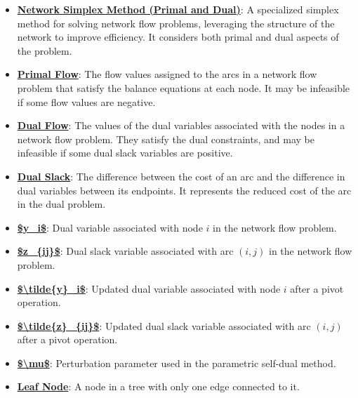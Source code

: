 \documentclass{article}%
\begin{document}
\begin{itemize}[leftmargin=*]%
\item \href{https://www.math.purdue.edu/~yipn/421//2024-11-07-NetSimplex.pdf#page=1}{\textbf{Network Simplex Method (Primal and Dual)}}: A specialized simplex method for solving network flow problems, leveraging the structure of the network to improve efficiency. It considers both primal and dual aspects of the problem.%
\item \href{https://www.math.purdue.edu/~yipn/421//2024-11-07-NetSimplex.pdf#page=2}{\textbf{Primal Flow}}: The flow values assigned to the arcs in a network flow problem that satisfy the balance equations at each node.  It may be infeasible if some flow values are negative.%
\item \href{https://www.math.purdue.edu/~yipn/421//2024-11-07-NetSimplex.pdf#page=3}{\textbf{Dual Flow}}: The values of the dual variables associated with the nodes in a network flow problem.  They satisfy the dual constraints, and may be infeasible if some dual slack variables are positive.%
\item \href{https://www.math.purdue.edu/~yipn/421//2024-11-07-NetSimplex.pdf#page=3}{\textbf{Dual Slack}}: The difference between the cost of an arc and the difference in dual variables between its endpoints.  It represents the reduced cost of the arc in the dual problem.%
\item \href{https://www.math.purdue.edu/~yipn/421//2024-11-07-NetSimplex.pdf#page=3}{\textbf{\$y\_i\$}}: Dual variable associated with node $i$ in the network flow problem.%
\item \href{https://www.math.purdue.edu/~yipn/421//2024-11-07-NetSimplex.pdf#page=3}{\textbf{\$z\_\{ij\}\$}}: Dual slack variable associated with arc $(i,j)$ in the network flow problem.%
\item \href{https://www.math.purdue.edu/~yipn/421//2024-11-07-NetSimplex.pdf#page=14}{\textbf{\$\textbackslash{}tilde\{y\}\_i\$}}: Updated dual variable associated with node $i$ after a pivot operation.%
\item \href{https://www.math.purdue.edu/~yipn/421//2024-11-07-NetSimplex.pdf#page=14}{\textbf{\$\textbackslash{}tilde\{z\}\_\{ij\}\$}}: Updated dual slack variable associated with arc $(i,j)$ after a pivot operation.%
\item \href{https://www.math.purdue.edu/~yipn/421//2024-11-07-NetSimplex.pdf#page=45}{\textbf{\$\textbackslash{}mu\$}}: Perturbation parameter used in the parametric self-dual method.%
\item \href{https://www.math.purdue.edu/~yipn/421//2024-11-07-NetSimplex.pdf#page=2}{\textbf{Leaf Node}}: A node in a tree with only one edge connected to it.%
\end{itemize}%
\end{document}

